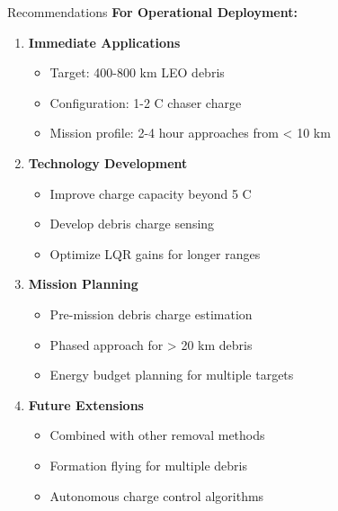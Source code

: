 \documentclass[aspectratio=169]{beamer}
\begin{document}
\begin{frame}{Recommendations}
\textbf{For Operational Deployment:}

\vspace{0.5em}
\begin{enumerate}
    \item \textbf{Immediate Applications}
    \begin{itemize}
        \item Target: 400-800 km LEO debris
        \item Configuration: 1-2 C chaser charge
        \item Mission profile: 2-4 hour approaches from < 10 km
    \end{itemize}

    \item \textbf{Technology Development}
    \begin{itemize}
        \item Improve charge capacity beyond 5 C
        \item Develop debris charge sensing
        \item Optimize LQR gains for longer ranges
    \end{itemize}

    \item \textbf{Mission Planning}
    \begin{itemize}
        \item Pre-mission debris charge estimation
        \item Phased approach for > 20 km debris
        \item Energy budget planning for multiple targets
    \end{itemize}

    \item \textbf{Future Extensions}
    \begin{itemize}
        \item Combined with other removal methods
        \item Formation flying for multiple debris
        \item Autonomous charge control algorithms
    \end{itemize}
\end{enumerate}
\end{frame}
\end{document}
